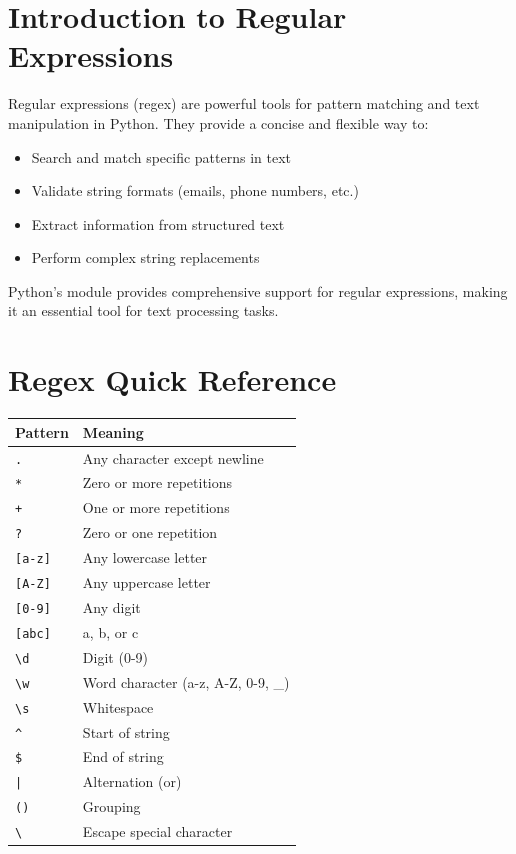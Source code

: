 \section{Introduction to Regular Expressions}

Regular expressions (regex) are powerful tools for pattern matching and text manipulation in Python. They provide a concise and flexible way to:

\begin{itemize}
    \item Search and match specific patterns in text
    \item Validate string formats (emails, phone numbers, etc.)
    \item Extract information from structured text
    \item Perform complex string replacements
\end{itemize}

Python's  module provides comprehensive support for regular expressions, making it an essential tool for text processing tasks.


\section*{Regex Quick Reference}

\begin{tabular}{ll}
\textbf{Pattern} & \textbf{Meaning} \\
\hline
\texttt{.} & Any character except newline \\
\texttt{*} & Zero or more repetitions \\
\texttt{+} & One or more repetitions \\
\texttt{?} & Zero or one repetition \\
\texttt{[a-z]} & Any lowercase letter \\
\texttt{[A-Z]} & Any uppercase letter \\
\texttt{[0-9]} & Any digit \\
\texttt{[abc]} & a, b, or c \\
\texttt{\textbackslash d} & Digit (0-9) \\
\texttt{\textbackslash w} & Word character (a-z, A-Z, 0-9, \_) \\
\texttt{\textbackslash s} & Whitespace \\
\texttt{\^} & Start of string \\
\texttt{\$} & End of string \\
\texttt{|} & Alternation (or) \\
\texttt{()} & Grouping \\
\texttt{\textbackslash} & Escape special character \\
\end{tabular}

